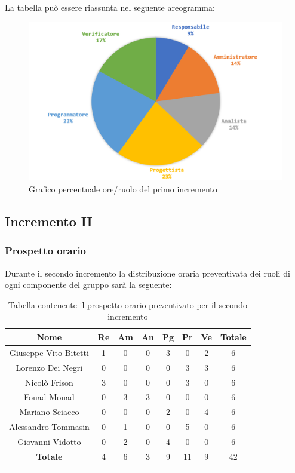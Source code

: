 		La tabella può essere riassunta nel seguente areogramma:
		\begin{figure}[H]
			\centering
			\includegraphics[width=0.8\linewidth]{./images/preventivo/incremento1-2.png}
			\caption{Grafico percentuale ore/ruolo del primo incremento}
			\label{fig:grafico costi ruolo incremento I}
		\end{figure}
	
	
	
	\subsection{Incremento II}
		\subsubsection{Prospetto orario}
		Durante il secondo incremento la distribuzione oraria preventivata dei ruoli di ogni componente del gruppo sarà la seguente:
		
		\begin{longtable}{|c|c|c|c|c|c|c|c|}
			\hline
			\rowcolor{lighter-grayer}
			\textbf{Nome} & \textbf{Re} & \textbf{Am} & \textbf{An} & \textbf{Pg}  & \textbf{Pr}   & \textbf{Ve} & \textbf{Totale} \\
			\hline
			\endfirsthead
			
			\hline
			Giuseppe Vito Bitetti 		 & 1 & 0 & 0 & 3 & 0 & 2 & 6\\
			\hline
			\hline
			Lorenzo Dei Negri			 & 0 & 0 & 0 & 0 & 3 & 3 & 6\\
			\hline
			\hline
			Nicolò Frison				    & 3 & 0 & 0 & 0 & 3 & 0 & 6\\
			\hline
			\hline
			Fouad Mouad 				 & 0 & 3 & 3 & 0 & 0 & 0 & 6\\
			\hline
			\hline
			Mariano Sciacco 			 & 0 & 0 & 0 & 2 & 0 & 4 & 6\\
			\hline
			\hline
			Alessandro Tommasin    & 0 & 1 & 0 & 0 & 5 & 0 & 6\\
			\hline
			\hline
			Giovanni Vidotto 			 & 0 & 2 & 0 & 4 & 0 & 0 & 6\\
			\hline 
			\textbf{Totale}			 		& 4 & 6 & 3 & 9 & 11 & 9 & 42\\
			\hline
			\caption{Tabella contenente il prospetto orario preventivato per il secondo incremento}
		\end{longtable}
		\pagebreak
		
